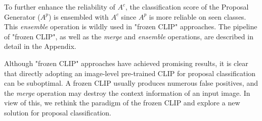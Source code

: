 To further enhance the reliability of $A^{c}$, the classification score of the Proposal Generator ($A^{p}$) is ensembled with $A^{c}$ since $A^{p}$ is more reliable on seen classes. This \textit{ensemble} operation is wildly used in "frozen CLIP" approaches.  The pipeline of "frozen CLIP", as well as the \textit{merge} and \textit{ensemble} operations, are described in detail in the Appendix. 

Although  "frozen CLIP" approaches have achieved promising results, it is clear that directly adopting an image-level pre-trained CLIP for proposal classification can be suboptimal. A frozen CLIP usually produces numerous false positives, and the \textit{merge} operation may destroy the context information of an input image. In view of this, we rethink the paradigm of the frozen CLIP and explore a new solution for proposal classification.